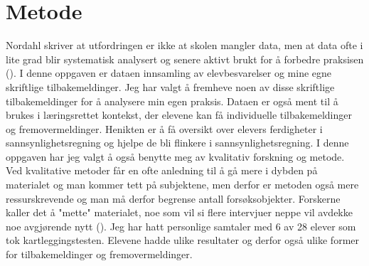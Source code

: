 \documentclass[main.tex]{subfiles}
\begin{document}
\section*{Metode}
\label{sec:2}
Nordahl skriver at utfordringen er ikke at skolen mangler data, men at data ofte i lite grad blir
systematisk analysert og senere aktivt brukt for å forbedre praksisen ().
I denne oppgaven er dataen innsamling av elevbesvarelser og mine egne skriftlige tilbakemeldinger.
Jeg har valgt å fremheve noen av disse skriftlige tilbakemeldinger for å analysere min egen praksis.
Dataen er også ment til å brukes i læringsrettet kontekst, der elevene kan få
individuelle tilbakemeldinger og fremovermeldinger. Henikten er å få oversikt over elevers 
ferdigheter i sannsynlighetsregning og hjelpe de bli flinkere i sannsynlighetsregning.
\newline
\newline
I denne oppgaven har jeg valgt å også benytte meg av kvalitativ forskning og metode. Ved
kvalitative metoder får en ofte anledning til å gå mere i dybden på materialet og man kommer
tett på subjektene, men derfor er metoden også mere ressurskrevende og man må derfor
begrense antall forsøksobjekter. Forskerne kaller det å "mette" materialet, noe som vil si 
flere intervjuer neppe vil avdekke noe avgjørende nytt (). Jeg har hatt
personlige samtaler med 6 av 28 elever som tok kartleggingstesten. Elevene hadde ulike
resultater og derfor også ulike former for tilbakemeldinger og fremovermeldinger.
\end{document}
